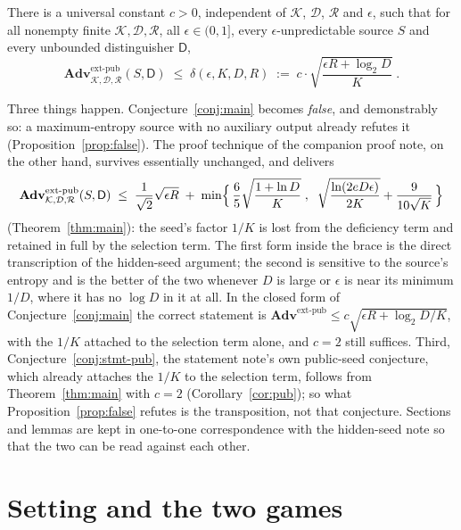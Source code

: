 \documentclass{conjura-solution}
\newcommand{\Adv}{\mathbf{Adv}}
\newcommand{\extp}{\mathrm{ext}\text{-}\mathrm{pub}}
\newcommand{\calK}{\mathcal{K}}
\newcommand{\calD}{\mathcal{D}}
\newcommand{\calR}{\mathcal{R}}
\begin{document}
\begin{conjecture}\label{conj:main}
There is a universal constant $c > 0$, independent of $\calK$, $\calD$, $\calR$ and $\epsilon$, such
that for all nonempty finite $\calK, \calD, \calR$, all $\epsilon \in (0,1]$, every
$\epsilon$-unpredictable source $S$ and every unbounded distinguisher $\mathsf{D}$,
\[
  \Adv^{\extp}_{\calK,\calD,\calR}(S,\mathsf{D})
  \;\le\; \delta(\epsilon,K,D,R)
  \;:=\; c \cdot \sqrt{\frac{\epsilon R + \log_2 D}{K}} \; .
\]
\end{conjecture}

\noindent
Three things happen. Conjecture~\ref{conj:main} becomes \emph{false}, and demonstrably so: a
maximum-entropy source with no auxiliary output already refutes it
(Proposition~\ref{prop:false}). The proof technique of the companion proof note, on the other
hand, survives essentially unchanged, and delivers
\[
  \Adv^{\extp}_{\calK,\calD,\calR}(S,\mathsf{D})
  \;\le\; \frac{1}{\sqrt{2}}\sqrt{\epsilon R}
  \;+\; \min\Bigl\{\, \frac{6}{5}\sqrt{\frac{1 + \ln D}{K}} \;,\;\;
        \sqrt{\frac{\ln(2eD\epsilon)}{2K}} + \frac{9}{10\sqrt{K}} \,\Bigr\}
\]
(Theorem~\ref{thm:main}): the seed's factor $1/K$ is lost from the deficiency term and retained in
full by the selection term. The first form inside the brace is the direct transcription of the
hidden-seed argument; the second is sensitive to the source's entropy and is the better of the two
whenever $D$ is large or $\epsilon$ is near its minimum $1/D$, where it has no $\log D$ in it at
all. In the closed form of Conjecture~\ref{conj:main} the correct statement is
$\Adv^{\extp} \le c\sqrt{\epsilon R + \log_2 D / K}$, with the $1/K$ attached to the selection term
alone, and $c = 2$ still suffices. Third, Conjecture~\ref{conj:stmt-pub}, the statement note's own
public-seed conjecture, which already attaches the $1/K$ to the selection term, follows from
Theorem~\ref{thm:main} with $c = 2$ (Corollary~\ref{cor:pub}); so what
Proposition~\ref{prop:false} refutes is the transposition, not that conjecture. Sections and lemmas are kept in one-to-one correspondence with
the hidden-seed note so that the two can be read against each other.

\section{Setting and the two games}\label{sec:setting}
\end{document}
